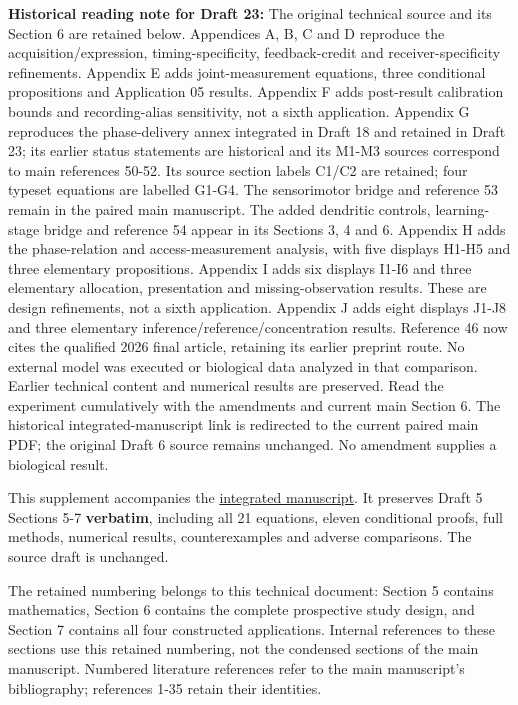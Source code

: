 \documentclass[
  american,
  11pt,
  letterpaper,
]{article}
\begin{document}
\textbf{Historical reading note for Draft 23:} The original technical source and its Section 6 are retained below. Appendices A, B, C and D reproduce the acquisition/expression, timing-specificity, feedback-credit and receiver-specificity refinements. Appendix E adds joint-measurement equations, three conditional propositions and Application 05 results. Appendix F adds post-result calibration bounds and recording-alias sensitivity, not a sixth application. Appendix G reproduces the phase-delivery annex integrated in Draft 18 and retained in Draft 23; its earlier status statements are historical and its M1-M3 sources correspond to main references 50-52. Its source section labels C1/C2 are retained; four typeset equations are labelled G1-G4. The sensorimotor bridge and reference 53 remain in the paired main manuscript. The added dendritic controls, learning-stage bridge and reference 54 appear in its Sections 3, 4 and 6. Appendix H adds the phase-relation and access-measurement analysis, with five displays H1-H5 and three elementary propositions. Appendix I adds six displays I1-I6 and three elementary allocation, presentation and missing-observation results. These are design refinements, not a sixth application. Appendix J adds eight displays J1-J8 and three elementary inference/reference/concentration results. Reference 46 now cites the qualified 2026 final article, retaining its earlier preprint route. No external model was executed or biological data analyzed in that comparison. Earlier technical content and numerical results are preserved. Read the experiment cumulatively with the amendments and current main Section 6. The historical integrated-manuscript link is redirected to the current paired main PDF; the original Draft 6 source remains unchanged. No amendment supplies a biological result.

This supplement accompanies the \href{https://zenodo.org/records/23455801/files/Learning-to-Feel-v1.1.pdf}{integrated manuscript}. It preserves Draft 5 Sections 5-7 \textbf{verbatim}, including all 21 equations, eleven conditional proofs, full methods, numerical results, counterexamples and adverse comparisons. The source draft is unchanged.

The retained numbering belongs to this technical document: Section 5 contains mathematics, Section 6 contains the complete prospective study design, and Section 7 contains all four constructed applications. Internal references to these sections use this retained numbering, not the condensed sections of the main manuscript. Numbered literature references refer to the main manuscript's bibliography; references 1-35 retain their identities.
\end{document}
